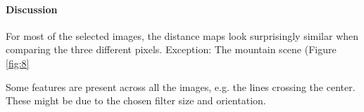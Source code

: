 \documentclass[11pt,a4paper]{article}
\begin{document}
\paragraph{Discussion}
For most of the selected images, the distance maps look surprisingly similar when comparing the three different pixels.
Exception: The mountain scene (Figure \ref{fig:8}

Some features are present across all the images, e.g. the lines crossing the center. These might be due to the chosen filter size and orientation.
\end{document}
